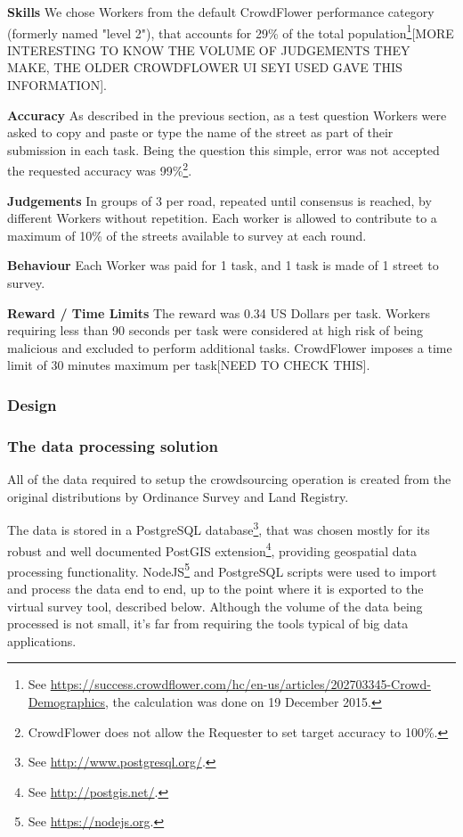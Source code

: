         \textbf{Skills} We chose Workers from the default CrowdFlower performance category (formerly named "level 2"), that accounts for 29\% of the total population\footnote{See \url{https://success.crowdflower.com/hc/en-us/articles/202703345-Crowd-Demographics}, the calculation was done on 19 December 2015.}[MORE INTERESTING TO KNOW THE VOLUME OF JUDGEMENTS THEY MAKE, THE OLDER CROWDFLOWER UI SEYI USED GAVE THIS INFORMATION].
        
        \textbf{Accuracy} As described in the previous section, as a test question Workers were asked to copy and paste or type the name of the street as part of their submission in each task. Being the question this simple, error was not accepted the requested accuracy was 99\%\footnote{CrowdFlower does not allow the Requester to set target accuracy to 100\%.}.

        \textbf{Judgements} In groups of 3 per road, repeated until consensus is reached, by different Workers without repetition. Each worker is allowed to contribute to a maximum of 10\% of the streets available to survey at each round.
        
        \textbf{Behaviour} Each Worker was paid for 1 task, and 1 task is made of 1 street to survey.

        \textbf{Reward / Time Limits} The reward was 0.34 US Dollars per task. Workers requiring less than 90 seconds per task were considered at high risk of being malicious and excluded to perform additional tasks. CrowdFlower imposes a time limit of 30 minutes maximum per task[NEED TO CHECK THIS].
    
    \subsubsection{Design}
    \subsubsection{The data processing solution}

        All of the data required to setup the crowdsourcing operation is created from the original distributions by Ordinance Survey and Land Registry. 
        
        The data is stored in a PostgreSQL database\footnote{See \url{http://www.postgresql.org/}.}, that was chosen mostly for its robust and well documented PostGIS extension\footnote{See \url{http://postgis.net/}.}, providing geospatial data processing functionality. NodeJS\footnote{See \url{https://nodejs.org}.} and PostgreSQL scripts were used to import and process the data end to end, up to the point where it is exported to the virtual survey tool, described below. Although the volume of the data being processed is not small, it's far from requiring the tools typical of big data applications. 
        
